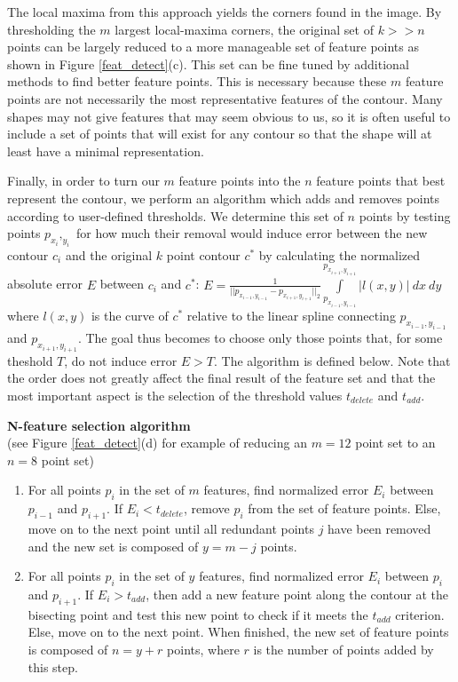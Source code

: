 \documentclass[paper=a4, fontsize=11pt]{scrartcl} %
\begin{document}
The local maxima from this approach yields the corners found in the image. By thresholding the $m$ largest local-maxima corners, the original set of $k >> n$ points can be largely reduced to a more manageable set of feature points as shown in Figure \ref{feat_detect}(c). This set can be fine tuned by additional methods to find better feature points. This is necessary because these $m$ feature points are not necessarily the most representative features of the contour. Many shapes may not give features that may seem obvious to us, so it is often useful to include a set of points that will exist for any contour so that the shape will at least have a minimal representation.  


Finally, in order to turn our $m$ feature points into the $n$ feature points that best represent the contour, we perform an algorithm which adds and removes points according to user-defined thresholds. We determine this set of $n$ points by testing points $p_{x_i},_{y_i}$ for how much their removal would induce error between the new contour $c_i$ and the original $k$ point contour $c^*$ by calculating the normalized absolute error $E$ between $c_i$ and $c^*$: $E = \frac{1}{|| p_{x_{i-1},y_{i-1}}  -  p_{x_{i+1},y_{i+1}} ||_2} \int\limits_{p_{x_{i-1},y_{i-1}}}^{p_{x_{i+1},y_{i+1}}} |l(x,y)| \ dx \ dy$ where $l(x,y)$ is the curve of $c^*$ relative to the linear spline connecting $p_{x_{i-1},y_{i-1}}$ and $p_{x_{i+1},y_{i+1}}$. The goal thus becomes to choose only those points that, for some theshold $T$, do not induce error $E > T$. The algorithm is defined below. Note that the order does not greatly affect the final result of the feature set and that the most important aspect is the selection of the threshold values $t_{delete}$ and $t_{add}$. 

\textbf{N-feature selection algorithm}
\\
(see Figure \ref{feat_detect}(d) for example of reducing an $m = 12$ point set to an $n = 8$ point set)
\begin{enumerate}
	\item 
	For all points $p_i$ in the set of $m$ features, find normalized error $E_i$ between $p_{i-1}$ and $p_{i+1}$. If $E_i < t_{delete}$, remove $p_i$ from the set of feature points. Else, move on to the next point until all redundant points $j$ have been removed and the new set is composed of $y = m - j$ points.  
	\item
	For all points $p_i$ in the set of $y$ features, find normalized error $E_i$ between $p_{i}$ and $p_{i+1}$. If $E_i > t_{add}$, then add a new feature point along the contour at the bisecting point and test this new point to check if it meets the $t_{add}$ criterion. Else, move on to the next point. When finished, the new set of feature points is composed of $n = y + r$ points, where $r$ is the number of points added by this step. 
\end{enumerate}
\end{document}
